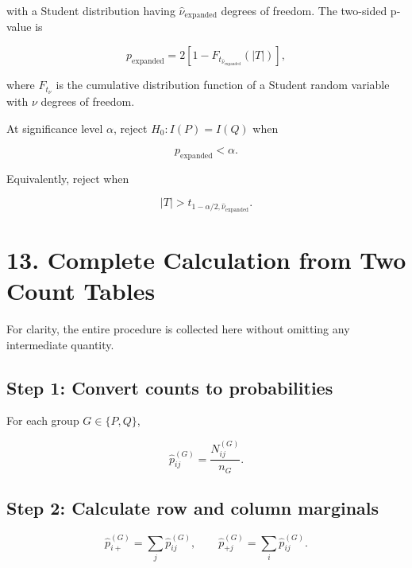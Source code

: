 \documentclass[
  11pt]{article}
\let\originalsection\section
\renewcommand{\section}{\clearpage\originalsection}
\begin{document}
with a Student distribution having \(\widehat\nu_{\mathrm{expanded}}\)
degrees of freedom. The two-sided p-value is

\begin{equation}
\boxed{
p_{\mathrm{expanded}}
=2\left[1-F_{t_{\widehat\nu_{\mathrm{expanded}}}}
(|T|)\right],
}
\end{equation}

where \(F_{t_\nu}\) is the cumulative distribution function of a Student
random variable with \(\nu\) degrees of freedom.

At significance level \(\alpha\), reject \(H_0:I(P)=I(Q)\) when

\begin{equation}
p_{\mathrm{expanded}}<\alpha.
\end{equation}

Equivalently, reject when

\begin{equation}
|T|>
t_{1-\alpha/2,\widehat\nu_{\mathrm{expanded}}}.
\end{equation}

\section{13. Complete Calculation from Two Count
Tables}\label{complete-calculation-from-two-count-tables}

For clarity, the entire procedure is collected here without omitting any
intermediate quantity.

\subsection{Step 1: Convert counts to
probabilities}\label{step-1-convert-counts-to-probabilities}

For each group \(G\in\{P,Q\}\),

\begin{equation}
\widehat p^{(G)}_{ij}=\frac{N^{(G)}_{ij}}{n_G}.
\end{equation}

\subsection{Step 2: Calculate row and column
marginals}\label{step-2-calculate-row-and-column-marginals}

\begin{equation}
\widehat p^{(G)}_{i+}=\sum_j\widehat p^{(G)}_{ij},
\qquad
\widehat p^{(G)}_{+j}=\sum_i\widehat p^{(G)}_{ij}.
\end{equation}
\end{document}

